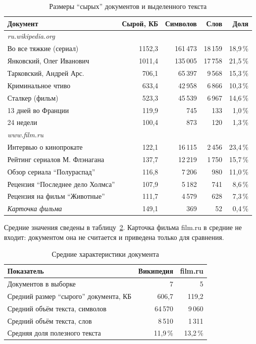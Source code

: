 \begin{table}[h]
\centering
\begin{tabular}{|l|r|r|r|r|}
\hline
\textbf{Документ} & \textbf{Сырой, КБ} & \textbf{Символов} & \textbf{Слов} & \textbf{Доля} \\
\hline
\multicolumn{5}{|l|}{\textit{ru.wikipedia.org}} \\
\hline
Во все тяжкие (сериал)      & 1152,3 & 161\,473 & 18\,159 & 18,9\,\% \\
Янковский, Олег Иванович    & 1011,4 & 135\,005 & 17\,758 & 21,5\,\% \\
Тарковский, Андрей Арс.     & 706,1 & 65\,397 & 9\,568 & 15,3\,\% \\
Криминальное чтиво          & 633,4 & 42\,958 & 6\,866 & 10,3\,\% \\
Сталкер (фильм)             & 523,3 & 45\,539 & 6\,967 & 14,6\,\% \\
13 дней во Франции          & 119,9 & 745 & 133 & 1,0\,\% \\
24 недели                   & 100,4 & 873 & 120 & 1,3\,\% \\
\hline
\multicolumn{5}{|l|}{\textit{www.film.ru}} \\
\hline
Интервью о кинопрокате               & 122,1 & 16\,115 & 2\,456 & 23,4\,\% \\
Рейтинг сериалов М. Флэнагана        & 137,7 & 12\,219 & 1\,750 & 15,7\,\% \\
Обзор сериала \enquote{Полураспад}   & 116,8 & 7\,206 & 980 & 11,0\,\% \\
Рецензия \enquote{Последнее дело Холмса} & 107,9 & 5\,182 & 741 & 8,6\,\% \\
Рецензия на фильм \enquote{Животные} & 111,7 & 4\,579 & 628 & 7,3\,\% \\
\textit{Карточка фильма}             & 149,1 &     369 &     52 &  0,4\,\% \\
\hline
\end{tabular}
\caption{Размеры \enquote{сырых} документов и выделенного текста}
\label{tab:sizes}
\end{table}

Средние значения сведены в таблицу~\ref{tab:avg}. Карточка фильма film.ru в средние
не входит: документом она не считается и приведена только для сравнения.

\begin{table}[h]
\centering
\begin{tabular}{|l|r|r|}
\hline
\textbf{Показатель} & \textbf{Википедия} & \textbf{film.ru} \\
\hline
Документов в выборке                          &       7 &       5 \\
Средний размер \enquote{сырого} документа, КБ &   606,7 &   119,2 \\
Средний объём текста, символов                & 64\,570 &  9\,060 \\
Средний объём текста, слов                    &  8\,510 &  1\,311 \\
Средняя доля полезного текста                 & 11,9\,\% & 13,2\,\% \\
\hline
\end{tabular}
\caption{Средние характеристики документа}
\label{tab:avg}
\end{table}

